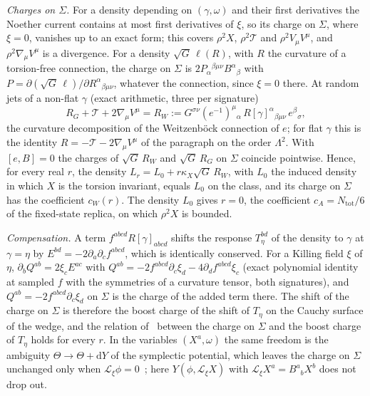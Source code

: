 \emph{Charges on \(\Sigma\).} For a density depending on \((\gamma,\omega)\) and their first derivatives the Noether current contains at most first derivatives of \(\xi\), so its charge on \(\Sigma\), where \(\xi=0\), vanishes up to an exact form; this covers \(\rho^2X\), \(\rho^2\mathcal T\) and \(\rho^2V_\mu V^\mu\), and \(\rho^2\nabla_\mu V^\mu\) is a divergence. For a density \(\sqrt G\,\ell(R)\), with \(R\) the curvature of a torsion-free connection, the charge on \(\Sigma\) is \(2P_\alpha{}^{\beta\mu\nu}B^\alpha{}_\beta\) with \(P=\partial(\sqrt G\,\ell)/\partial R^\alpha{}_{\beta\mu\nu}\), whatever the connection, since \(\xi=0\) there. At random jets of a non-flat \(\gamma\) (exact arithmetic, three per signature)
\[
  R_G+\mathcal T+2\nabla_\mu V^\mu=R_W:=G^{\sigma\nu}(e^{-1})^\mu{}_\alpha\,R[\gamma]^\alpha{}_{\beta\mu\nu}\,e^\beta{}_\sigma ,
\]
the curvature decomposition of the Weitzenb\"ock connection of \(e\); for flat \(\gamma\) this is the identity \(R=-\mathcal T-2\nabla_\mu V^\mu\) of the paragraph on the order \(\Lambda^2\). With \([e,B]=0\) the charges of \(\sqrt G\,R_W\) and \(\sqrt G\,R_G\) on \(\Sigma\) coincide pointwise. Hence, for every real \(r\), the density \(L_r=L_0+r\kappa_X\sqrt G\,R_W\), with \(L_0\) the induced density in which \(X\) is the torsion invariant, equals \(L_0\) on the class, and its charge on \(\Sigma\) has the coefficient \(c_W(r)\). The density \(L_0\) gives \(r=0\), the coefficient \(c_A=N_{\mathrm{tot}}/6\) of the fixed-state replica, on which \(\rho^2X\) is bounded.

\emph{Compensation.} A term \(f^{abcd}R[\gamma]_{abcd}\) shifts the response \(T_\eta^{bd}\) of the density to \(\gamma\) at \(\gamma=\eta\) by \(E^{bd}=-2\partial_a\partial_cf^{abcd}\), which is identically conserved. For a Killing field \(\xi\) of \(\eta\), \(\partial_bQ^{ab}=2\xi_cE^{ac}\) with \(Q^{ab}=-2f^{abcd}\partial_c\xi_d-4\partial_df^{abcd}\xi_c\) (exact polynomial identity at sampled \(f\) with the symmetries of a curvature tensor, both signatures), and \(Q^{ab}=-2f^{abcd}\partial_c\xi_d\) on \(\Sigma\) is the charge of the added term there. The shift of the charge on \(\Sigma\) is therefore the boost charge of the shift of \(T_\eta\) on the Cauchy surface of the wedge, and the relation of~\cite{IyerWald1994} between the charge on \(\Sigma\) and the boost charge of \(T_\eta\) holds for every \(r\). In the variables \((X^a,\omega)\) the same freedom is the ambiguity \(\Theta\to\Theta+\mathrm dY\) of the symplectic potential, which leaves the charge on \(\Sigma\) unchanged only when \(\mathcal L_\xi\phi=0\)~\cite{JacobsonKangMyers1994}; here \(Y(\phi,\mathcal L_\xi X)\) with \(\mathcal L_\xi X^a=B^a{}_bX^b\) does not drop out.

